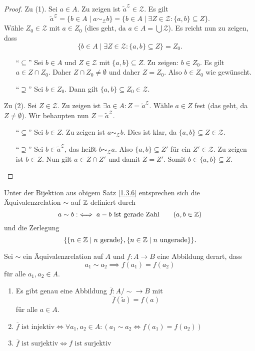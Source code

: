 \documentclass[../../main.tex]{subfiles}
\begin{document}
\begin{proof}
\noindent
Zu (1). Sei $a\in A$. Zu zeigen ist $\widetilde a^\mathcal Z\in\mathcal Z$. Es gilt
$$\widetilde a^\mathcal Z=\{b\in A\mid a\sim_\mathcal Zb\}=\{b\in A\mid\exists Z\in\mathcal Z:\{a,b\}\subseteq Z\}.$$
Wähle $Z_0\in\mathcal Z$ mit $a\in Z_0$ (dies geht, da $a\in A=\bigcup\mathcal Z$). Es reicht nun zu zeigen, dass
$$\{b\in A\mid\exists Z\in\mathcal Z:\{a,b\}\subseteq Z\}=Z_0.$$
\begin{enumerate}
\item["`$\subseteq$"'] Sei $b\in A$ und $Z\in\mathcal Z$ mit $\{a,b\}\subseteq Z$. Zu zeigen: $b\in Z_0$. Es gilt $a\in Z\cap Z_0$. Daher $Z\cap Z_0\ne\emptyset$ und daher $Z=Z_0$. Also $b\in Z_0$ wie gewünscht.
\item["`$\supseteq$"'] Sei $b\in Z_0$. Dann gilt $\{a,b\}\subseteq Z_0\in\mathcal Z$.
\end{enumerate}

\smallskip\noindent
Zu (2). Sei $Z\in\mathcal Z$. Zu zeigen ist $\exists a\in A:Z=\widetilde a^\mathcal Z$. Wähle $a\in Z$ fest (das geht, da $Z\ne\emptyset$). Wir behaupten nun $Z=\widetilde a^\mathcal Z$.
\begin{enumerate}
\item["`$\subseteq$"'] Sei $b\in Z$. Zu zeigen ist $a\sim_\mathcal Zb$. Dies ist klar, da $\{a,b\}\subseteq Z\in\mathcal Z$.
\item["`$\supseteq$"'] Sei $b\in\widetilde a^\mathcal Z$, das heißt $b\sim_\mathcal Za$. Also $\{a,b\}\subseteq Z'$ für ein
$Z'\in\mathcal Z$.
Zu zeigen ist $b\in Z$. Nun gilt $a\in Z\cap Z'$ und damit $Z=Z'$. Somit $b\in\{a,b\}\subseteq Z$.
\end{enumerate}
\end{proof}

\begin{bsp}\label{1.3.7}
Unter der Bijektion aus obigem Satz \ref{1.3.6} entsprechen sich die Äquivalenzrelation $\sim$ auf $\mathbb Z$ definiert durch
$$a\sim b:\iff\text{$a-b$ ist gerade Zahl}\qquad(a,b\in\mathbb Z)$$
und die Zerlegung
$$\{\{n\in\mathbb Z\mid\text{$n$ gerade}\},\{n\in\mathbb Z\mid\text{$n$ ungerade}\}\}.$$
\end{bsp}


\begin{sat}\label{1.3.8}
Sei $\sim$ ein Äquivalenzrelation auf $A$ und $f\colon A\to B$ eine Abbildung
derart, dass
$$a_1\sim a_2\implies f(a_1)=f(a_2)$$
für alle $a_1,a_2\in A$.
\begin{enumerate}[\rm(a)]
\item
Es gibt genau eine Abbildung $\overline f\colon A/\text{$\sim$}\to B$ mit
$$\overline f(\widetilde a)=f(a)$$ für alle $a\in A$. 
\item
$\text{$\overline f$ ist injektiv}\iff\forall a_1,a_2\in A:(a_1\sim a_2\iff f(a_1)=f(a_2))$
\item
$\text{$\overline f$ ist surjektiv}\iff\text{$f$ ist surjektiv}$
\end{enumerate}
\end{sat}
\end{document}
